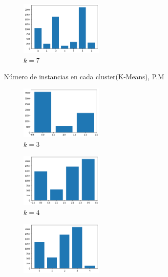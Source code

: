 \begin{figure}[H]
\begin{subfigure}{.5\textwidth}
  \centering
  \includegraphics[width=0.45\textwidth]{imagenes/counter/pm/km7.png}
  \caption{$k=7$}
\end{subfigure}
\caption{Número de instancias en cada cluster(K-Means), P.M}
\label{fig:hm-km}
\end{figure}


\begin{figure}[H]
\begin{subfigure}{.5\textwidth}
  \centering
  \includegraphics[width=0.45\textwidth]{imagenes/counter/pm/agg3.png}
  \caption{$k=3$}
\end{subfigure}%
\begin{subfigure}{.5\textwidth}
  \centering
  \includegraphics[width=0.45\textwidth]{imagenes/counter/pm/agg4.png}
  \caption{$k=4$}
\end{subfigure}
\begin{subfigure}{.5\textwidth}
  \centering
  \includegraphics[width=0.45\textwidth]{imagenes/counter/pm/agg5.png}

\end{subfigure}
\end{figure}
